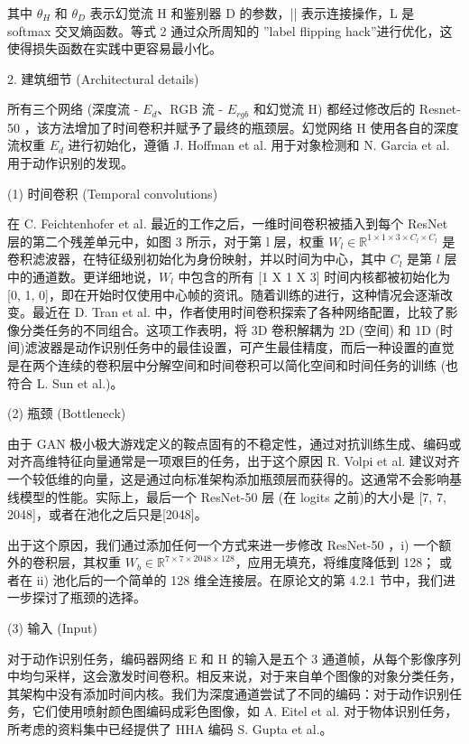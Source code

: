 其中 $\theta_{H}$ 和 $\theta_{D}$ 表示幻觉流 H 和鉴别器 D 的参数，|| 表示连接操作，L 是 softmax 交叉熵函数。等式 2 通过众所周知的 ”label flipping hack”进行优化，这使得损失函数在实践中更容易最小化。

2. 建筑细节 (Architectural details) 

所有三个网络 (深度流 - $E_{d}$、RGB 流 - $E_{rgb}$ 和幻觉流 H) 都经过修改后的 Resnet-50 ，该方法增加了时间卷积并赋予了最终的瓶颈层。幻觉网络 H 使用各自的深度流权重 $E_{d}$ 进行初始化，遵循 J. Hoffman et al. 用于对象检测和 N. Garcia et al. 用于动作识别的发现。

(1) 时间卷积 (Temporal convolutions)

在 C. Feichtenhofer et al. 最近的工作之后，一维时间卷积被插入到每个 ResNet 层的第二个残差单元中，如图 3 所示，对于第 l 层，权重 $W_{l} \in \mathbb{R}^{1 \times 1 \times 3 \times C_{l} \times C_{l}}$ 是卷积滤波器，在特征级别初始化为身份映射，并以时间为中心，其中 $C_{l}$ 是第 $l$ 层中的通道数。更详细地说，$W_{l}$ 中包含的所有 [1 X 1 X 3] 时间内核都被初始化为 [0, 1, 0]，即在开始时仅使用中心帧的资讯。随着训练的进行，这种情况会逐渐改变。最近在 D. Tran et al. 中，作者使用时间卷积探索了各种网络配置，比较了影像分类任务的不同组合。这项工作表明，将 3D 卷积解耦为 2D (空间) 和 1D (时间)滤波器是动作识别任务中的最佳设置，可产生最佳精度，而后一种设置的直觉是在两个连续的卷积层中分解空间和时间卷积可以简化空间和时间任务的训练 (也符合 L. Sun et al.)。

(2) 瓶颈 (Bottleneck) 

由于 GAN 极小极大游戏定义的鞍点固有的不稳定性，通过对抗训练生成、编码或对齐高维特征向量通常是一项艰巨的任务，出于这个原因 R. Volpi et al. 建议对齐一个较低维的向量，这是通过向标准架构添加瓶颈层而获得的。这通常不会影响基线模型的性能。实际上，最后一个 ResNet-50 层 (在 logits 之前)的大小是 [7, 7, 2048]，或者在池化之后只是[2048]。

出于这个原因，我们通过添加任何一个方式来进一步修改 ResNet-50 ，i) 一个额外的卷积层，其权重 $W_{b} \in \mathbb{R}^{7 \times 7 \times 2048 \times 128}$，应用无填充，将维度降低到 128； 或者在 ii) 池化后的一个简单的 128 维全连接层。在原论文的第 4.2.1 节中，我们进一步探讨了瓶颈的选择。

(3) 输入 (Input) 

对于动作识别任务，编码器网络 E 和 H 的输入是五个 3 通道帧，从每个影像序列中均匀采样，这会激发时间卷积。相反来说，对于来自单个图像的对象分类任务，其架构中没有添加时间内核。我们为深度通道尝试了不同的编码：对于动作识别任务，它们使用喷射颜色图编码成彩色图像，如 A. Eitel et al. 对于物体识别任务，所考虑的资料集中已经提供了 HHA 编码 S. Gupta et al.。

